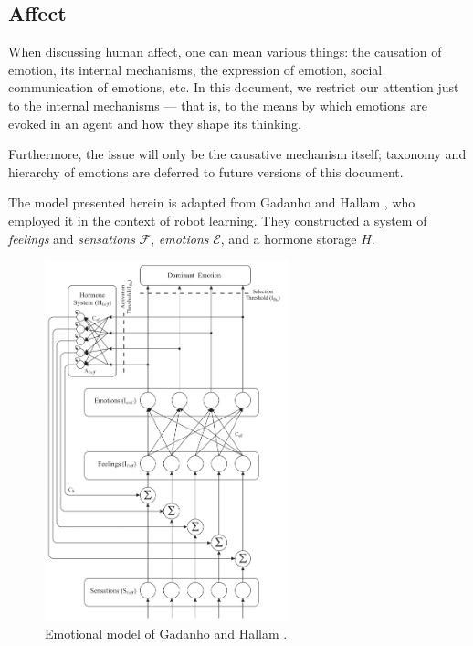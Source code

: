 \subsection{Affect}\label{sec:affect}

When discussing human affect, one can mean various things: the causation of emotion, its internal mechanisms, the expression of emotion, social communication of emotions, etc. In this document, we restrict our attention just to the internal mechanisms --- that is, to the means by which emotions are evoked in an agent and how they shape its thinking.

Furthermore, the issue will only be the causative mechanism itself; taxonomy and hierarchy of emotions are deferred to future versions of this document.

The model presented herein is adapted from Gadanho and Hallam \cite{DBLP:journals/adb/GadanhoH01}, who employed it in the context of robot learning. They constructed a system of \emph{feelings} and \emph{sensations} $\mathcal{F}$, \emph{emotions} $\mathcal{E}$, and a hormone storage $H$.

\begin{figure}[!h]
	\centering
	\includegraphics[width=200pt]{Figs/gadanhoModel.png}
	\caption{Emotional model of Gadanho and Hallam \cite[p.\ 46]{DBLP:journals/adb/GadanhoH01}.}
	\label{fig:gadanhoModel}
\end{figure}

